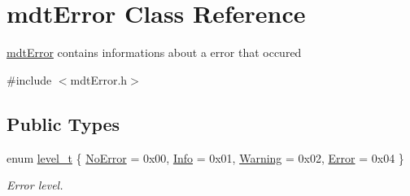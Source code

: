 \hypertarget{classmdt_error}{
\section{mdtError Class Reference}
\label{classmdt_error}
}


\hyperlink{classmdt_error}{mdtError} contains informations about a error that occured  




{\ttfamily \#include $<$mdtError.h$>$}

\subsection*{Public Types}
\begin{DoxyCompactItemize}
\item 
enum \hyperlink{classmdt_error_a5c8b1a040e2feaa848f6201d6b6f0cd7}{level\_\-t} \{ \hyperlink{classmdt_error_a5c8b1a040e2feaa848f6201d6b6f0cd7a1ba619a7f332d8fe18fb3cd270ff86eb}{NoError} =  0x00, 
\hyperlink{classmdt_error_a5c8b1a040e2feaa848f6201d6b6f0cd7a24688d5f5af0a3a54636fa1a4b2f60fc}{Info} =  0x01, 
\hyperlink{classmdt_error_a5c8b1a040e2feaa848f6201d6b6f0cd7a61d92805e90226faf3d1c5fd350a0ab8}{Warning} =  0x02, 
\hyperlink{classmdt_error_a5c8b1a040e2feaa848f6201d6b6f0cd7a35f5c05a7d15b6433445cdbffa6d5260}{Error} =  0x04
 \}
\begin{DoxyCompactList}\small\item\em Error level. \end{DoxyCompactList}\end{DoxyCompactItemize}

